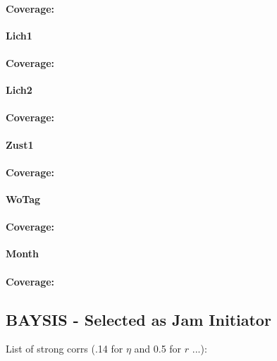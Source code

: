 \paragraph{Coverage:}

\large
\centerline{\textbf{Lich1}}
\normalsize

\paragraph{Coverage:}

\large
\centerline{\textbf{Lich2}}
\normalsize

\paragraph{Coverage:}

\large
\centerline{\textbf{Zust1}}
\normalsize

\paragraph{Coverage:}

\large
\centerline{\textbf{WoTag}}
\normalsize

\paragraph{Coverage:}

\large
\centerline{\textbf{Month}}
\normalsize

\paragraph{Coverage:}

\subsection{BAYSIS - Selected as Jam Initiator}

List of strong corrs (.14 for $\eta$ and 0.5 for $r$ ...):


